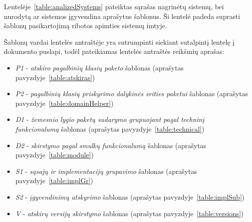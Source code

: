 Lentelėje~\ref{table:analizedSystems} pateiktas sąrašas nagrinėtų sistemų, bei nurodytą ar sistemos įgyvendina aprašytus šablonus.
Ši lentelė padeda suprasti šablonų pasikartojimą ribotos apimties sistemų imtyje.

Šablonų vardai lentelės antraštėje yra sutrumpinti siekiant sutalpintį lentelę į dokumento puslapi, todėl pateikiamas lentelės antraštės reikšmių aprašas:
\begin{itemize}
    \item \textit{P1} - \textit{atskiro pagalbinių klasių paketo} šablonas (aprašytas pavyzdyje~\ref{table:atskiras})
    \item \textit{P2} - \textit{pagalbinių klasių priskyrimo dalykinės srities paketui} šablonas (aprašytas pavyzdyje~\ref{table:domainHelper})
    \item \textit{D1} - \textit{žemesnio lygio paketų sudarymo grupuojant pagal techninį funkcionalumą} šablonas (aprašytas pavyzdyje~\ref{table:technical})
    \item \textit{D2} - \textit{skirstymo pagal smulkų funkcionalumą} šablonas (aprašytas pavyzdyje~\ref{table:module})
    \item \textit{S1} - \textit{sąsajų ir implementacijų grupavimo} šablonas (aprašytas pavyzdyje~\ref{table:implGr})
    \item \textit{S2} - \textit{įgyvendinimų atskyrimo} šablonas (aprašytas pavyzdyje~\ref{table:implSub})
    \item \textit{V} - \textit{atskirų versijų skirstymo} šablonas (aprašytas pavyzdyje~\ref{table:versions})
\end{itemize}


